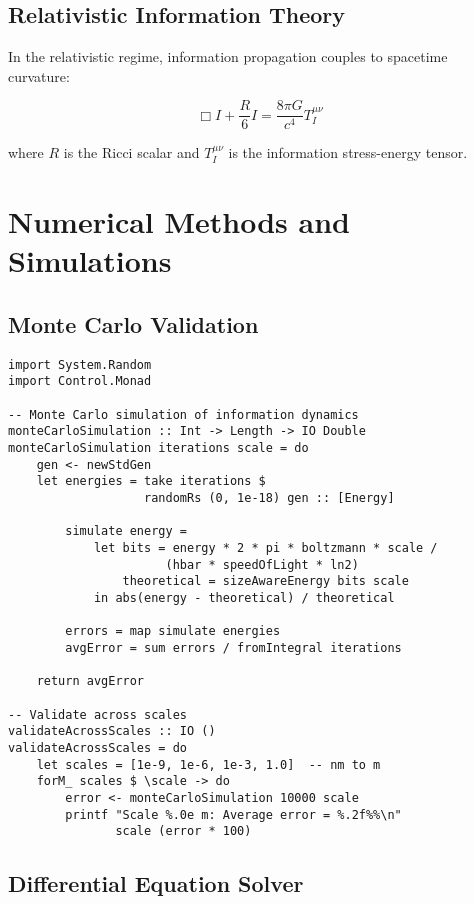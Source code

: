 \documentclass[11pt,a4paper]{article}
\theoremstyle{definition}
\begin{document}
\subsection{Relativistic Information Theory}

In the relativistic regime, information propagation couples to spacetime curvature:

\begin{equation}
\Box I + \frac{R}{6}I = \frac{8\pi G}{c^4} T_I^{\mu\nu}
\end{equation}

where $R$ is the Ricci scalar and $T_I^{\mu\nu}$ is the information stress-energy tensor.

\section{Numerical Methods and Simulations}

\subsection{Monte Carlo Validation}

\begin{lstlisting}
import System.Random
import Control.Monad

-- Monte Carlo simulation of information dynamics
monteCarloSimulation :: Int -> Length -> IO Double
monteCarloSimulation iterations scale = do
    gen <- newStdGen
    let energies = take iterations $ 
                   randomRs (0, 1e-18) gen :: [Energy]
        
        simulate energy = 
            let bits = energy * 2 * pi * boltzmann * scale / 
                      (hbar * speedOfLight * ln2)
                theoretical = sizeAwareEnergy bits scale
            in abs(energy - theoretical) / theoretical
        
        errors = map simulate energies
        avgError = sum errors / fromIntegral iterations
        
    return avgError

-- Validate across scales
validateAcrossScales :: IO ()
validateAcrossScales = do
    let scales = [1e-9, 1e-6, 1e-3, 1.0]  -- nm to m
    forM_ scales $ \scale -> do
        error <- monteCarloSimulation 10000 scale
        printf "Scale %.0e m: Average error = %.2f%%\n" 
               scale (error * 100)
\end{lstlisting}

\subsection{Differential Equation Solver}
\end{document}
